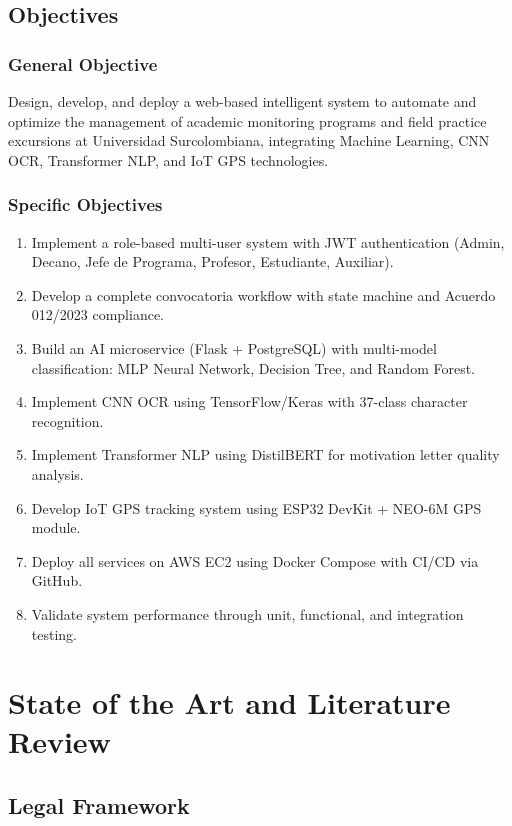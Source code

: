\documentclass[12pt,a4paper]{report}
\begin{document}
\section{Objectives}

\subsection{General Objective}
Design, develop, and deploy a web-based intelligent system to automate and optimize the management of academic monitoring programs and field practice excursions at Universidad Surcolombiana, integrating Machine Learning, CNN OCR, Transformer NLP, and IoT GPS technologies.

\subsection{Specific Objectives}
\begin{enumerate}
    \item Implement a role-based multi-user system with JWT authentication (Admin, Decano, Jefe de Programa, Profesor, Estudiante, Auxiliar).
    \item Develop a complete convocatoria workflow with state machine and Acuerdo 012/2023 compliance.
    \item Build an AI microservice (Flask + PostgreSQL) with multi-model classification: MLP Neural Network, Decision Tree, and Random Forest.
    \item Implement CNN OCR using TensorFlow/Keras with 37-class character recognition.
    \item Implement Transformer NLP using DistilBERT for motivation letter quality analysis.
    \item Develop IoT GPS tracking system using ESP32 DevKit + NEO-6M GPS module.
    \item Deploy all services on AWS EC2 using Docker Compose with CI/CD via GitHub.
    \item Validate system performance through unit, functional, and integration testing.
\end{enumerate}

\chapter{State of the Art and Literature Review}

\section{Legal Framework}
\end{document}

